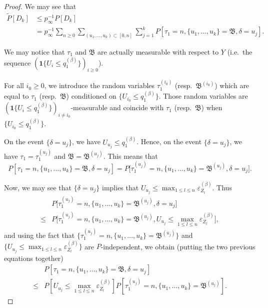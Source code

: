 \documentclass[12pt]{amsart}
\numberwithin{equation}{section}
\begin{document}
 \begin{proof}
 We may see that
 \begin{align}
 \label{step1}
  \tilde{P}[D_k] & \leq p_{\infty}^{-1} P[D_k] \\ \nonumber
                          & = p_{\infty}^{-1}\sum_{n\geq 0} \sum_{ (u_1,\ldots,u_k) \subset [0,n]} \sum_{j=1}^k P[\tau_1=n, \{u_1,\ldots,u_k\}=\mathfrak{B}, \delta=u_j].
 \end{align}
 
 We may notice that $\tau_1$ and $\mathfrak{B}$ are actually measurable with respect to $Y$ (i.e.~the sequence $({{\mathbf 1}{\{{U_i\leq q_1^{(\beta)}}\}}})_{i\geq 0}$).
 
  For all $i_0\geq 0$, we introduce the random variables $\tau_1^{(i_0)}$ (resp.~$\mathfrak{B}^{(i_0)}$) which are equal to $\tau_1$ (resp.~$\mathfrak{B}$) conditioned on $\{U_{i_0}\leq q_1^{(\beta)}\}$. Those random variables are $({{\mathbf 1}{\{{U_i\leq q_1^{(\beta)}}\}}})_{i\neq i_0}$-measurable and coincide with $\tau_1$ (resp.~$\mathfrak{B}$) when $\{U_{i_0}\leq q_1^{(\beta)}\}$.
  
  On the event $\{\delta=u_j\}$, we have $U_{u_j}\leq q_1^{(\beta)}$. Hence, on the event $\{\delta=u_j\}$, we have $\tau_1=\tau_1^{(u_j)}$ and $\mathfrak{B}=\mathfrak{B}^{(u_j)}$. This means that 
 \[
 P[\tau_1=n, \{u_1,\ldots,u_k\}=\mathfrak{B}, \delta=u_j]= P\bigl[\tau_1^{(u_j)}=n, \{u_1,\ldots,u_k\}=\mathfrak{B}^{(u_j)}, \delta=u_j\bigr].
 \]
 
 Now, we may see that $\{\delta=u_j\}$ implies that $U_{u_j}\leq \max_{1\leq l\leq n}{\varepsilon}_{Z_{l}}^{(\beta)}$. Thus
                          \begin{align*}
                          & P\bigl[\tau_1^{(u_j)}=n, \{u_1,\ldots,u_k\}=\mathfrak{B}^{(u_j)}, \delta=u_j\bigr]  \\
                          \leq &P\bigl[\tau_1^{(u_j)}=n, \{u_1,\ldots,u_k\}=\mathfrak{B}^{(u_j)}, U_{u_j}\leq \max_{1\leq l\leq n}{\varepsilon}_{Z_{l}}^{(\beta)}\bigr],
                          \end{align*}
                          and using the fact that $\{\tau_1^{(u_j)}=n, \{u_1,\ldots,u_k\}=\mathfrak{B}^{(u_j)}\}$ and $\{U_{u_j}\leq \max_{1\leq l\leq n}{\varepsilon}_{Z_{l}}^{(\beta)}\}$ are $P$-independent, we obtain (putting the two previous equations together)
                          \begin{align}\label{step3}
 & P[\tau_1=n, \{u_1,\ldots,u_k\}=\mathfrak{B}, \delta=u_j] \\ \nonumber 
  \leq & P[U_{u_j}
 \leq \max_{1\leq l\leq n}{\varepsilon}_{Z_{l}}^{(\beta)}] P[\tau_1^{(u_j)}=n, \{u_1,\ldots,u_k\}=\mathfrak{B}^{(u_j)}].
 \end{align}
 

\end{proof}
\end{document}
